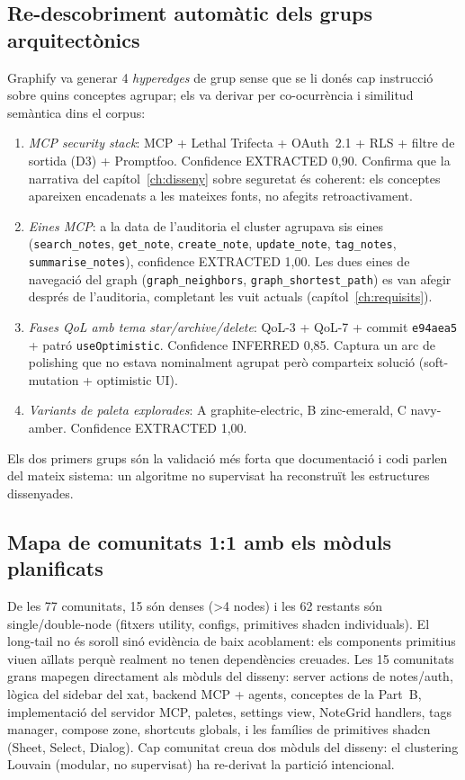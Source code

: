 \subsection{Re-descobriment automàtic dels grups arquitectònics}
Graphify va generar 4 \emph{hyperedges} de grup sense que se li donés cap instrucció sobre quins conceptes agrupar; els va derivar per co-ocurrència i similitud semàntica dins el corpus:

\begin{enumerate}
    \item \emph{MCP security stack}: MCP + Lethal Trifecta + OAuth~2.1 + RLS + filtre de sortida (D3) + Promptfoo. Confidence EXTRACTED 0,90. Confirma que la narrativa del capítol~\ref{ch:disseny} sobre seguretat és coherent: els conceptes apareixen encadenats a les mateixes fonts, no afegits retroactivament.
    \item \emph{Eines MCP}: a la data de l'auditoria el cluster agrupava sis eines (\texttt{search\_notes}, \texttt{get\_note}, \texttt{create\_note}, \texttt{update\_note}, \texttt{tag\_notes}, \texttt{summarise\_notes}), confidence EXTRACTED 1,00. Les dues eines de navegació del graph (\texttt{graph\_neighbors}, \texttt{graph\_shortest\_path}) es van afegir després de l'auditoria, completant les vuit actuals (capítol~\ref{ch:requisits}).
    \item \emph{Fases QoL amb tema star/archive/delete}: QoL-3 + QoL-7 + commit \texttt{e94aea5} + patró \texttt{useOptimistic}. Confidence INFERRED 0,85. Captura un arc de polishing que no estava nominalment agrupat però comparteix solució (soft-mutation + optimistic UI).
    \item \emph{Variants de paleta explorades}: A graphite-electric, B zinc-emerald, C navy-amber. Confidence EXTRACTED 1,00.
\end{enumerate}

Els dos primers grups són la validació més forta que documentació i codi parlen del mateix sistema: un algoritme no supervisat ha reconstruït les estructures dissenyades.

\subsection{Mapa de comunitats 1:1 amb els mòduls planificats}
De les 77 comunitats, 15 són denses (>4 nodes) i les 62 restants són single/double-node (fitxers utility, configs, primitives shadcn individuals). El long-tail no és soroll sinó evidència de baix acoblament: els components primitius viuen aïllats perquè realment no tenen dependències creuades. Les 15 comunitats grans mapegen directament als mòduls del disseny: server actions de notes/auth, lògica del sidebar del xat, backend MCP + agents, conceptes de la Part~B, implementació del servidor MCP, paletes, settings view, NoteGrid handlers, tags manager, compose zone, shortcuts globals, i les famílies de primitives shadcn (Sheet, Select, Dialog). Cap comunitat creua dos mòduls del disseny: el clustering Louvain (modular, no supervisat) ha re-derivat la partició intencional.

